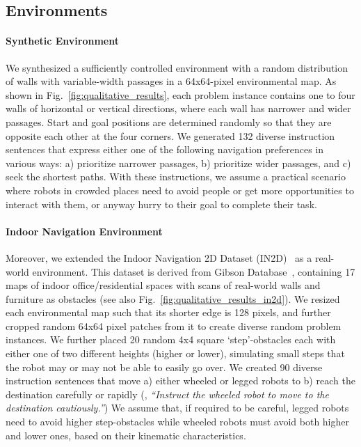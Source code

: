 \subsection{Environments}
\paragraph{Synthetic Environment}
We synthesized a sufficiently controlled environment with a random distribution of walls with variable-width passages in a 64x64-pixel environmental map. As shown in Fig.~\ref{fig:qualitative_results}, each problem instance contains one to four walls of horizontal or vertical directions, where each wall has narrower and wider passages. Start and goal positions are determined randomly so that they are opposite each other at the four corners. We generated 132 diverse instruction sentences that express either one of the following navigation preferences in various ways: a) prioritize narrower passages, b) prioritize wider passages, and c) seek the shortest paths. With these instructions, we assume a practical scenario where robots in crowded places need to avoid people or get more opportunities to interact with them, or anyway hurry to their goal to complete their task.

\paragraph{Indoor Navigation Environment}
Moreover, we extended the Indoor Navigation 2D Dataset (IN2D)~\cite{dobrevskiskocaj2020in2d} as a real-world environment. This dataset is derived from Gibson Database~\cite{xiazamirhe2018gibsonenv}, containing 17 maps of indoor office/residential spaces with scans of real-world walls and furniture as obstacles (see also Fig.~\ref{fig:qualitative_results_in2d}). We resized each environmental map such that its shorter edge is 128 pixels, and further cropped random 64x64 pixel patches from it to create diverse random problem instances. We further placed 20 random 4x4 square `step'-obstacles each with either one of two different heights (higher or lower), simulating small steps that the robot may or may not be able to easily go over. We created 90 diverse instruction sentences that move a) either wheeled or legged robots to b) reach the destination carefully or rapidly (\eg, \emph{``Instruct the wheeled robot to move to the destination cautiously.''}) We assume that, if required to be careful, legged robots need to avoid higher step-obstacles while wheeled robots must avoid both higher and lower ones, based on their kinematic characteristics.

